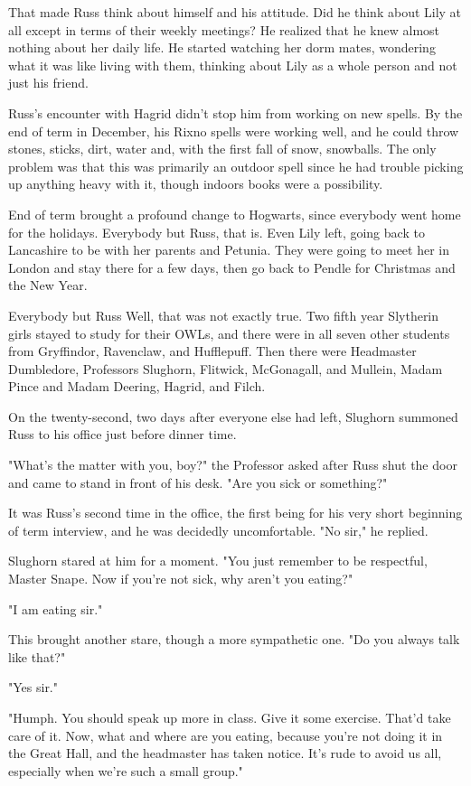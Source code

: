 That made Russ think about himself and his attitude. Did he think about Lily at all except in terms of their weekly meetings? He realized that he knew almost nothing about her daily life. He started watching her dorm mates, wondering what it was like living with them, thinking about Lily as a whole person and not just his friend.

Russ's encounter with Hagrid didn't stop him from working on new spells. By the end of term in December, his Rixno spells were working well, and he could throw stones, sticks, dirt, water and, with the first fall of snow, snowballs. The only problem was that this was primarily an outdoor spell since he had trouble picking up anything heavy with it, though indoors books were a possibility.

End of term brought a profound change to Hogwarts, since everybody went home for the holidays. Everybody but Russ, that is. Even Lily left, going back to Lancashire to be with her parents and Petunia. They were going to meet her in London and stay there for a few days, then go back to Pendle for Christmas and the New Year.

Everybody but Russ{\el} Well, that was not exactly true. Two fifth year Slytherin girls stayed to study for their OWLs, and there were in all seven other students from Gryffindor, Ravenclaw, and Hufflepuff. Then there were Headmaster Dumbledore, Professors Slughorn, Flitwick, McGonagall, and Mullein, Madam Pince and Madam Deering, Hagrid, and Filch.

On the twenty-second, two days after everyone else had left, Slughorn summoned Russ to his office just before dinner time.

"What's the matter with you, boy?" the Professor asked after Russ shut the door and came to stand in front of his desk. "Are you sick or something?"

It was Russ's second time in the office, the first being for his very short beginning of term interview, and he was decidedly uncomfortable. "No{\el} sir," he replied.

Slughorn stared at him for a moment. "You just remember to be respectful, Master Snape. Now if you're not sick, why aren't you eating?"

"I{\el} am{\el} eating{\el} sir."

This brought another stare, though a more sympathetic one. "Do you always talk like that?"

"Yes{\el} sir."

"Humph. You should speak up more in class. Give it some exercise. That'd take care of it. Now, what and where are you eating, because you're not doing it in the Great Hall, and the headmaster has taken notice. It's rude to avoid us all, especially when we're such a small group."

